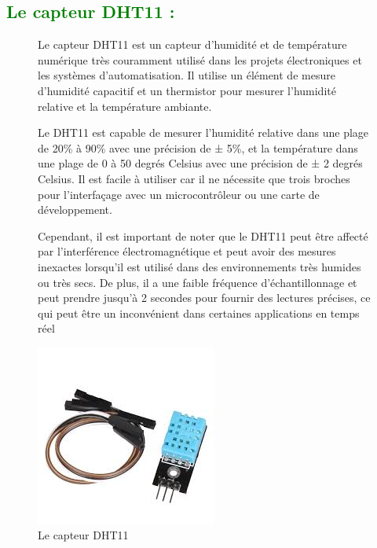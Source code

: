 \begin{flushleft}
	\subsection{\textcolor{green}{Le capteur DHT11 :}}
		\begin{figure}[h]
			\begin{minipage}{0.6\textwidth}
				Le capteur DHT11 est un capteur d'humidité et de température numérique très couramment utilisé dans les projets électroniques et les systèmes d'automatisation. Il utilise un élément de mesure d'humidité capacitif et un thermistor pour mesurer l'humidité relative et la température ambiante.
				
				Le DHT11 est capable de mesurer l'humidité relative dans une plage de 20\% à 90\% avec une précision de ± 5\%, et la température dans une plage de 0 à 50 degrés Celsius avec une précision de ± 2 degrés Celsius. Il est facile à utiliser car il ne nécessite que trois broches pour l'interfaçage avec un microcontrôleur ou une carte de développement.
				
				Cependant, il est important de noter que le DHT11 peut être affecté par l'interférence électromagnétique et peut avoir des mesures inexactes lorsqu'il est utilisé dans des environnements très humides ou très secs. De plus, il a une faible fréquence d'échantillonnage et peut prendre jusqu'à 2 secondes pour fournir des lectures précises, ce qui peut être un inconvénient dans certaines applications en temps réel
			\end{minipage}
			\begin{minipage}{0.4\textwidth}
				\centering
				\includegraphics[width=\textwidth]{chapitres/images/dht11.jpg}
				\caption{Le capteur DHT11}
				\label{fig:votre_image}
			\end{minipage}
		\end{figure}

\end{flushleft}
